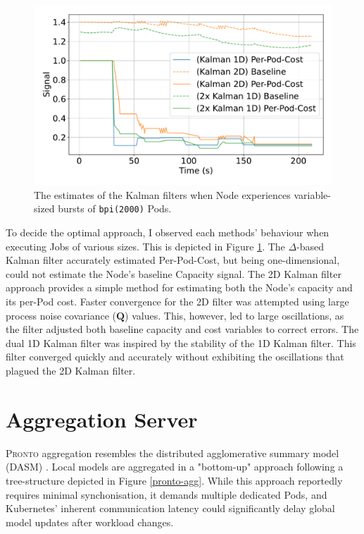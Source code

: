 \begin{figure}[H]
    \centering
    \includegraphics[width=\textwidth]{images/filter-comparison.pdf}
    \caption{The estimates of the Kalman filters when Node experiences
    variable-sized bursts of \texttt{bpi(2000)} Pods.}
    \label{fig:filter-evaluation}
\end{figure}
To decide the optimal approach, I observed each methods' behaviour when
executing Jobs of various sizes. This is depicted in Figure
\ref{fig:filter-evaluation}.
The $\Delta$-based Kalman filter accurately estimated Per-Pod-Cost, but being
one-dimensional, could not estimate the Node's baseline Capacity signal. The 2D
Kalman filter approach provides a simple method for estimating both the Node's
capacity and its per-Pod cost. Faster convergence for the 2D filter was
attempted using large process noise covariance ($\mathbf{Q}$) values. This, however,
led to large oscillations, as the filter adjusted both baseline capacity and
cost variables to correct errors. The dual 1D Kalman filter was inspired by the
stability of the 1D Kalman filter. This filter converged quickly and accurately
without exhibiting the oscillations that plagued the 2D Kalman filter.

\section{Aggregation Server}
\textsc{Pronto} aggregation resembles the distributed agglomerative summary
model (DASM) \cite{}. Local models are aggregated in a "bottom-up" approach
following a tree-structure depicted in Figure \ref{pronto-agg}. While this
approach reportedly requires minimal synchonisation, it demands
multiple dedicated Pods, and Kubernetes' inherent communication latency could
significantly delay global model updates after workload changes.

